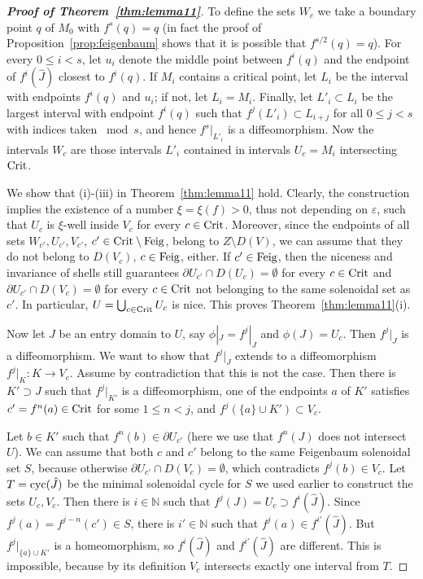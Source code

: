 \documentclass[12pt, psamsfonts, reqno]{amsart}
\begin{document}
\begin{proof}[\textbf{Proof of Theorem~\ref{thm:lemma11}}]
To define the  sets $W_c$ we take a boundary point $q$ of $M_0$
with $f^s(q)=q$ (in fact the proof of
Proposition~\ref{prop:feigenbaum} shows that it is possible that
$f^{s/2}(q)=q$). For every $0\leq i<s$, let $u_i$ denote the
middle point between $f^i(q)$ and the endpoint of $f^i(\hat J)$
closest to $f^i(q)$. If $M_i$ contains a critical point, let $L_i$
be the interval with endpoints $f^i(q)$ and $u_i$; if not, let
$L_i=M_i$. Finally, let $L'_i\subset L_i$ be the largest interval
with endpoint $f^i(q)$ such that $f^j(L'_i) \subset L_{i+j}$ for
all $0 \leq j < s$ with indices taken $\bmod s$, and hence
$f^s|_{L'_i}$ is a diffeomorphism.
Now the intervals $W_c$ are those intervals $L'_i$ contained in
intervals $U_c=M_i$ intersecting ${\mathop{\rm Crit}\nolimits}$.

We show that (i)-(iii) in Theorem~\ref{thm:lemma11} hold.
Clearly, the construction implies the existence of a number
$\xi=\xi(f)>0$, thus not depending on ${\varepsilon}$, such that $U_c$ is
$\xi$-well inside $V_c$ for every $c\in {\mathop{\rm Crit}\nolimits}$. Moreover, since
the endpoints of all sets $W_{c'},U_{c'},V_{c'}$, $c'\in
{\mathop{\rm Crit}\nolimits}\setminus {\mathop{\rm Feig}\nolimits}$, belong to $Z\setminus D(V)$, we can assume
that they do not belong to $D(V_c)$, $c\in {\mathop{\rm Feig}\nolimits}$, either. If
$c'\in {\mathop{\rm Feig}\nolimits}$, then the niceness and invariance of shells still
guarantees $\partial U_{c'}\cap D(U_c)=\emptyset$ for every $c\in
{\mathop{\rm Crit}\nolimits}$ and $\partial U_{c'}\cap D(V_c)=\emptyset$ for every $c\in
{\mathop{\rm Crit}\nolimits}$ not belonging to the same solenoidal set as $c'$. In
particular, $U=\bigcup_{c\in {\mathop{\rm Crit}\nolimits}} U_c$ is nice. This proves
Theorem~\ref{thm:lemma11}(i).

Now let $J$ be an entry domain to $U$, say $\phi|_J=f^j|_J$ and
$\phi(J)=U_c$. Then $f^j|_J$ is a diffeomorphism. We want to show
that $f^j|_J$ extends to a diffeomorphism $f^j|_K:K\to V_c$.
Assume by contradiction that this is not the case.
Then there is $K'\supset J$ such that
$f^j|_{K'}$ is a diffeomorphism, one of the endpoints $a$ of $K'$
satisfies $c'=f^n(a)\in {\mathop{\rm Crit}\nolimits}$ for some $1\leq n<j$, and
$f^j(\{a\}\cup K')\subset V_c$.

Let $b\in K'$ such that $f^n(b)\in
\partial U_{c'}$ (here we use that $f^n(J)$ does not intersect $U$). We can
assume that both $c$ and $c'$ belong to the same Feigenbaum
solenoidal set $S$, because otherwise $\partial U_{c'}\cap
D(V_c)=\emptyset$, which contradicts $f^j(b)\in V_c$. Let
$T={\mathop{\rm cyc}\nolimits}(\hat J)$ be the minimal solenoidal cycle for $S$ we used
earlier to construct the sets $U_c,V_c$. Then there is $i \in {{\mathbb N}}$
such that $f^j(J)=U_c\supset f^i(\hat J)$. Since
$f^j(a)=f^{j-n}(c')\in S$, there is $i' \in {{\mathbb N}}$ such that
$f^j(a)\in f^{i'}(\hat J)$. But $f^j|_{\{a\}\cup K'}$ is a
homeomorphism, so $f^i(\hat J)$ and $f^{i'}(\hat J)$ are
different. This is impossible, because by its definition $V_c$
intersects exactly one interval from $T$.


\end{proof}
\end{document}
